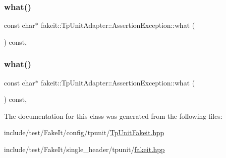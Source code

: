 \subsubsection{\texorpdfstring{what()}{what()}\hspace{0.1cm}{\footnotesize\ttfamily [1/2]}}
{\footnotesize\ttfamily const char$\ast$ fakeit\+::\+Tp\+Unit\+Adapter\+::\+Assertion\+Exception\+::what (\begin{DoxyParamCaption}{ }\end{DoxyParamCaption}) const\hspace{0.3cm}{\ttfamily [inline]}, {\ttfamily [override]}}

\mbox{\label{classfakeit_1_1TpUnitAdapter_1_1AssertionException_af19b3f6451bacf8f7b5b4cc36b2ac0c6}} 
\subsubsection{\texorpdfstring{what()}{what()}\hspace{0.1cm}{\footnotesize\ttfamily [2/2]}}
{\footnotesize\ttfamily const char$\ast$ fakeit\+::\+Tp\+Unit\+Adapter\+::\+Assertion\+Exception\+::what (\begin{DoxyParamCaption}{ }\end{DoxyParamCaption}) const\hspace{0.3cm}{\ttfamily [inline]}, {\ttfamily [override]}}



The documentation for this class was generated from the following files\+:\begin{DoxyCompactItemize}
\item 
include/test/\+Fake\+It/config/tpunit/\mbox{\hyperlink{TpUnitFakeit_8hpp}{Tp\+Unit\+Fakeit.\+hpp}}\item 
include/test/\+Fake\+It/single\+\_\+header/tpunit/\mbox{\hyperlink{single__header_2tpunit_2fakeit_8hpp}{fakeit.\+hpp}}\end{DoxyCompactItemize}
